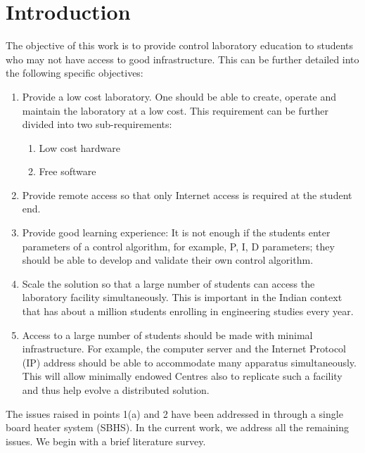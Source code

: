 \section{Introduction}
\label{sec:intro}
The objective of this work is to provide control laboratory
education to students who may not have access to good infrastructure.
This can be further detailed into the following specific objectives:
\begin{enumerate}
\item Provide a low cost laboratory.  One should be able to create,
  operate and maintain the laboratory at a low cost.  This requirement
  can be further divided into two sub-requirements:
\begin{enumerate}
\item Low cost hardware
\item Free software
\end{enumerate}
\item Provide remote access so that only Internet access is required
  at the student end.
\item Provide good learning experience:  It is not enough if the
  students enter parameters of a control algorithm, for example, P, I,
  D parameters;  they should be able to develop and validate their own
  control algorithm.
\item Scale the solution so that a large number of students can access
  the laboratory facility simultaneously.  This is important in the
  Indian context that has about a million students enrolling in
  engineering studies every year.
\item Access to a large number of students should be made with minimal
  infrastructure.  For example, the computer server and the Internet
  Protocol (IP) address should be able to accommodate many apparatus
  simultaneously.  This will allow minimally endowed Centres also to
  replicate such a facility and thus help evolve a distributed
  solution.  
\end{enumerate}
The issues raised in points 1(a) and 2 have been addressed in
\cite{ia010,vlabs-kmm} through a single board heater system (SBHS).
In the current work, we address all the remaining issues.  We begin
with a brief literature survey.  



